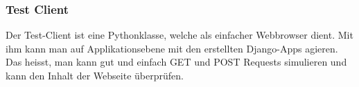 \subsubsection*{Test Client}
Der Test-Client ist eine Pythonklasse, welche als einfacher Webbrowser dient. Mit ihm kann man auf Applikationsebene mit den erstellten Django-Apps agieren. Das heisst, man kann gut und einfach GET und POST Requests simulieren und kann den Inhalt der Webseite überprüfen. 